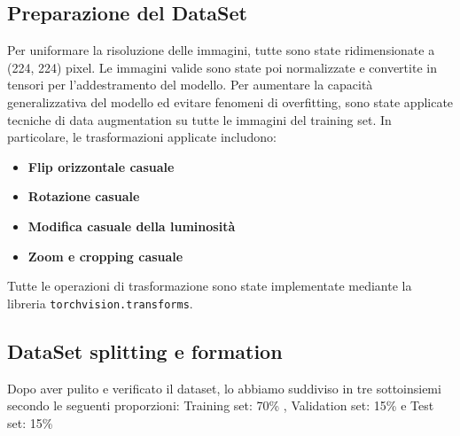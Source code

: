 \documentclass[main.tex]{subfiles}
\begin{document}
\subsection{Preparazione del DataSet}

Per uniformare la risoluzione delle immagini, tutte sono state ridimensionate a (224, 224) pixel. Le immagini valide sono state poi normalizzate e convertite in tensori per l’addestramento del modello.
Per aumentare la capacità generalizzativa del modello ed evitare fenomeni di overfitting, sono state applicate tecniche di data augmentation su tutte le immagini del training set. In particolare, le trasformazioni applicate includono:

\begin{itemize}
    \item \textbf{Flip orizzontale casuale}
    \item \textbf{Rotazione casuale}
    \item \textbf{Modifica casuale della luminosità}
    \item \textbf{Zoom e cropping casuale}
\end{itemize}
Tutte le operazioni di trasformazione sono state implementate mediante la libreria \texttt{torchvision.\allowbreak transforms}.


\subsection{DataSet splitting e formation}

Dopo aver pulito e verificato il dataset, lo abbiamo suddiviso in tre sottoinsiemi secondo le seguenti proporzioni: Training set: 70\% , Validation set: 15\% e Test set: 15\%
\end{document}
